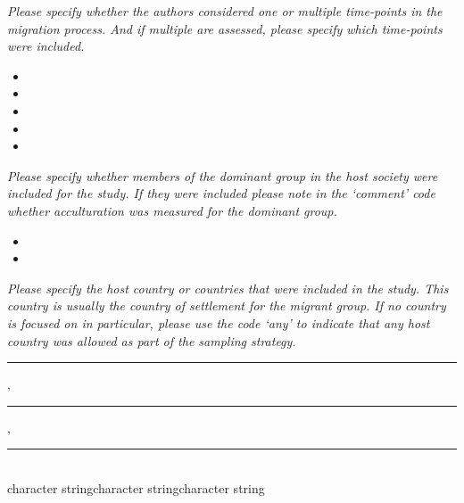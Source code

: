 \documentclass[10pt,a4paper]{protocol}
\newlength{\rulewidth}
\newlength{\ruleandnamegap}
\newcommand{\namefont}{\tiny}
\begin{document}
\textit{Please specify whether the authors considered one or multiple time-points in the migration process. And if multiple are assessed, please specify which time-points were included.}
\vspace{0.5em}
\begin{itemize}
	\item {}
    \item {}
    \item {}
    \item {}
    \item {}
\end{itemize}
\divider

\textit{Please specify whether members of the dominant group in the host society were included for the study. If they were included please note in the `comment' code whether acculturation was measured for the dominant group.}
\vspace{0.5em}
\begin{itemize}
	\item {}
    \item {}
\end{itemize}
\divider

\clearpage
\vspace*{2em}

\textit{Please specify the host country or countries that were included in the study. This country is usually the country of settlement for the migrant group. If no country is focused on in particular, please use the code `any' to indicate that any host country was allowed as part of the sampling strategy.}
\vspace{1.5em}

\rule{3cm}{} , \rule{3cm}{} , \rule{3cm}{}\\
\vspace{\dimexpr-\baselineskip+\ruleandnamegap}
{\namefont character string\hspace{2.08cm}character string\hspace{2.08cm}character string}\par
\divider
\end{document}
